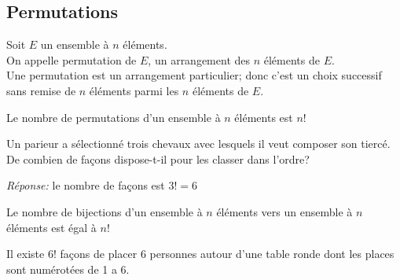 \subsection{Permutations}
\begin{definition}
Soit $ E $ un ensemble à $ n $ éléments.\\
On appelle permutation de $ E $, un arrangement des $ n $ éléments de $ E. $\\
Une permutation est un arrangement particulier; donc c'est un choix successif sans remise de $ n $ éléments  parmi les $ n $ éléments de $ E. $
\end{definition}
\begin{property}
Le nombre de permutations d'un ensemble à $ n $ éléments est $ n! $
\end{property}
 \begin{example}
 Un parieur a sélectionné trois chevaux avec lesquels il veut composer son tiercé. De combien de façons  dispose-t-il pour les classer dans l'ordre? 
  \end{example}
 \textit{Réponse:}  le nombre de façons est $ 3!= 6 $
	
\begin{property}
 Le nombre de bijections  d'un ensemble à $ n $ éléments vers un ensemble à $ n $ éléments est égal à $ n! $
 \end{property}
 \begin{example}
 Il existe $ 6! $ façons de placer 6 personnes autour d'une table ronde  dont les places sont numérotées de 1 a 6.	
 \end{example}
 

